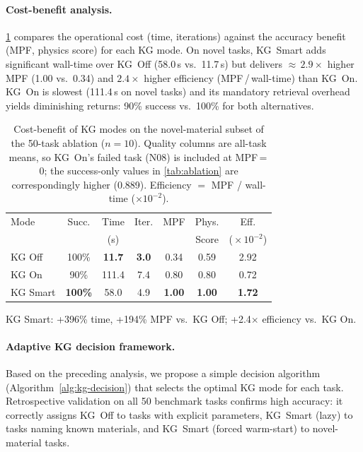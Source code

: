 \documentclass[preprint,review,12pt]{elsarticle}
\newif\ifrevisionsvisible
\newcommand{\revised}[1]{%
  \ifrevisionsvisible\textcolor{revisionred}{#1}\else#1\fi}
\begin{document}
\paragraph{Cost-benefit analysis.}
\cref{tab:cost-benefit} compares the operational cost (time, iterations)
against the accuracy benefit (MPF, physics score) for each KG mode.
On novel tasks, KG~Smart adds significant wall-time over KG~Off
(58.0\,s vs.\ 11.7\,s) but delivers ${\approx}\,2.9\times$ higher
MPF (1.00 vs.\ 0.34) and $2.4\times$ higher efficiency
(MPF\,/\,wall-time) than KG~On.  KG~On is slowest (111.4\,s on novel
tasks) and its mandatory retrieval overhead yields diminishing returns:
90\% success vs.\ 100\% for both alternatives.

\begin{table}[t]
\centering
\caption{Cost-benefit of KG modes on the novel-material subset of the
50-task ablation ($n{=}10$).  \revised{Quality columns are all-task means, so
KG~On's failed task (N08) is included at MPF\,=\,0; the success-only
values in \cref{tab:ablation} are correspondingly higher (0.889).}
Efficiency $=$ MPF / wall-time ($\times10^{-2}$).}
\label{tab:cost-benefit}
\footnotesize
\setlength{\tabcolsep}{3.5pt}
\begin{tabular}{@{}lcccccc@{}}
\toprule
Mode & Succ. & Time & Iter. & MPF & Phys. & Eff. \\
     &       & (s)  &       &     & Score & ($\!\times\!10^{-2}$) \\
\midrule
KG Off   & 100\% & \textbf{11.7} & \textbf{3.0} & 0.34 & 0.59 & 2.92 \\
KG On    &  90\% & 111.4 & 7.4 & 0.80 & 0.80 & 0.72 \\
KG Smart & \textbf{100\%} & 58.0 & 4.9 & \textbf{1.00} & \textbf{1.00} & \textbf{1.72} \\
\bottomrule
\end{tabular}

\vspace{0.3em}
{\scriptsize KG Smart: +396\% time, +194\% MPF vs.\ KG Off; +2.4$\times$ efficiency vs.\ KG On.}
\end{table}

\paragraph{Adaptive KG decision framework.}
Based on the preceding analysis, we propose a simple decision algorithm
(Algorithm~\ref{alg:kg-decision}) that selects the optimal KG mode for
each task.  Retrospective validation on all 50 benchmark tasks
confirms high accuracy: it correctly assigns KG~Off to tasks with
explicit parameters, KG~Smart (lazy) to tasks naming known materials,
and KG~Smart (forced warm-start) to novel-material tasks.
\end{document}
